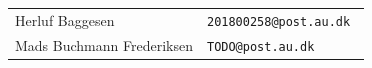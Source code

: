 \clearpage
\maketitle
\vspace{9cm}
\begin{tabular}{l l}
    Herluf Baggesen & \tt{201800258@post.au.dk} \\
    Mads Buchmann Frederiksen & \tt{TODO@post.au.dk} \\
\end{tabular}
\thispagestyle{empty} %
\begin{bottom}

\end{bottom}
\pagebreak
\setcounter{page}{1}
